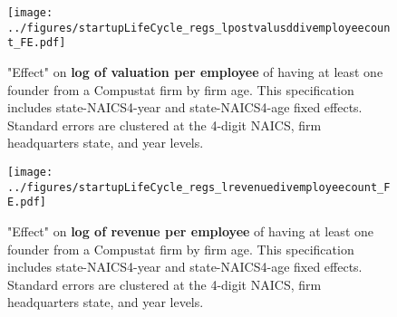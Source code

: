 \documentclass[12pt,english]{article}
\theoremstyle{remark}
\begin{document}
\begin{figure}
	\texttt{[image: ../figures/startupLifeCycle\_regs\_lpostvalusddivemployeecount\_FE.pdf]}
	\caption{"Effect" on \textbf{log of valuation per employee} of having at least one founder from a Compustat firm by firm age. This specification includes state-NAICS4-year and state-NAICS4-age fixed effects. Standard errors are clustered at the 4-digit NAICS, firm headquarters state, and year levels.}
\end{figure}

\begin{figure}
	\texttt{[image: ../figures/startupLifeCycle\_regs\_lrevenuedivemployeecount\_FE.pdf]}
	\caption{"Effect" on \textbf{log of revenue per employee} of having at least one founder from a Compustat firm by firm age. This specification includes state-NAICS4-year and state-NAICS4-age fixed effects. Standard errors are clustered at the 4-digit NAICS, firm headquarters state, and year levels.}
\end{figure}
\end{document}

